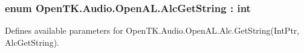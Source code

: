 \hypertarget{namespace_open_t_k_1_1_audio_1_1_open_a_l_a7ea538b81f9d8c91017cfd2f5794cd99}{
\subsubsection[{Alc\-Get\-String}]{\setlength{\rightskip}{0pt plus 5cm}enum {\bf Open\-T\-K.\-Audio.\-Open\-A\-L.\-Alc\-Get\-String} \-: int}}\label{namespace_open_t_k_1_1_audio_1_1_open_a_l_a7ea538b81f9d8c91017cfd2f5794cd99}


Defines available parameters for Open\-T\-K.\-Audio.\-Open\-A\-L.\-Alc.\-Get\-String(\-Int\-Ptr, Alc\-Get\-String). 

